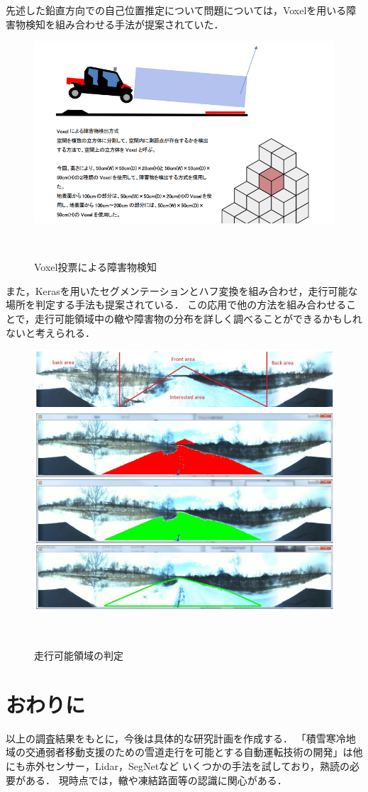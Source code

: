 \documentclass[a4paper]{jarticle}
\begin{document}
先述した鉛直方向での自己位置推定について問題については，Voxelを用いる障害物検知を組み合わせる手法が提案されていた．

\begin{figure}[H]
  \centering
  \includegraphics[width=0.5\linewidth]{picture/voxel.png}
  \caption{Voxel投票による障害物検知}　
  \label{voxel}
\end{figure}

また，Kerasを用いたセグメンテーションとハフ変換を組み合わせ，走行可能な場所を判定する手法も提案されている．
この応用で他の方法を組み合わせることで，走行可能領域中の轍や障害物の分布を詳しく調べることができるかもしれないと考えられる．

\begin{figure}[H]
  \centering
  \includegraphics[width=0.5\linewidth]{picture/soukou.png}
  \caption{走行可能領域の判定}　
  \label{voxel}
\end{figure}

%
\section{おわりに}
%
以上の調査結果をもとに，今後は具体的な研究計画を作成する．
「積雪寒冷地域の交通弱者移動支援のための雪道走行を可能とする自動運転技術の開発」は他にも赤外センサー，Lidar，SegNetなど
いくつかの手法を試しており，熟読の必要がある．
現時点では，轍や凍結路面等の認識に関心がある．
%
%


%
\end{document}
